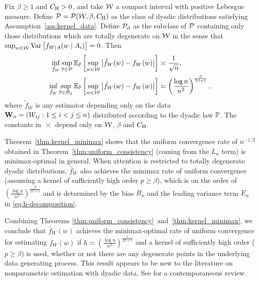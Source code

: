 \begin{theorem}
  \label{thm:kernel_minimax}

  Fix $\beta \geq 1$ and $C_\rH > 0$, and take $\cW$ a compact interval with
  positive Lebesgue measure. Define $\cP = \cP(\cW, \beta, C_\rH)$ as the class
  of dyadic distributions satisfying Assumption~\ref{ass:kernel_data}. Define
  $\cP_\rd$ as the subclass of $\cP$ containing only those distributions which
  are totally degenerate on $\cW$ in the sense that
  $\sup_{w \in \cW} \Var\left[f_{W \mid A}(w \mid A_i)\right] = 0$. Then
  \begin{align*}
    \inf_{\tilde f_W}
    \sup_{\P \in \cP}
    \E_\P\left[
      \sup_{w \in \cW}
      \big| \tilde f_W(w) - f_W(w) \big|
    \right]
    &\asymp
    \frac{1}{\sqrt n}, \\
    \inf_{\tilde f_W}
    \sup_{\P \in \cP_\rd}
    \E_\P\left[
      \sup_{w \in \cW}
      \big| \tilde f_W(w) - f_W(w) \big|
    \right]
    &\asymp
    \left( \frac{\log n}{n^2} \right)^{\frac{\beta}{2\beta+1}},
  \end{align*}
  where $\tilde f_W$ is any estimator depending only on the data
  $\bW_n = (W_{i j}: 1 \leq i < j \leq n)$ distributed according to the dyadic
  law $\P$. The constants in $\asymp$ depend only on $\cW$, $\beta$ and $C_\rH$.

\end{theorem}

Theorem~\ref{thm:kernel_minimax} shows that the uniform convergence rate of
$n^{-1/2}$ obtained in Theorem~\ref{thm:uniform_consistency}
(coming from the $L_n$ term) is minimax-optimal in general.
When attention is restricted to totally degenerate dyadic distributions,
$\hat f_W$ also achieves the minimax rate of uniform convergence
(assuming a kernel of sufficiently high order $p \geq \beta$),
which is on the order of
$\left(\frac{\log n}{n^2}\right)^{\frac{\beta}{2\beta+1}}$ and
is determined by the bias $B_n$ and the leading variance term $E_n$ in
\eqref{eq:h-decomposition}.

Combining Theorems \ref{thm:uniform_consistency}~and~\ref{thm:kernel_minimax},
we conclude that $\hat{f}_W(w)$ achieves the minimax-optimal rate of uniform
convergence for estimating $f_W(w)$ if $h \asymp \left( \frac{\log n}{n^2}
\right)^{\frac{1}{2\beta+1}}$ and a kernel of sufficiently high order
($p \geq \beta$) is used, whether or not there are any degenerate points in the
underlying data generating process. This result appears to be new to the
literature on nonparametric estimation with dyadic data. See
\citet{gao2021minimax} for a contemporaneous review.

